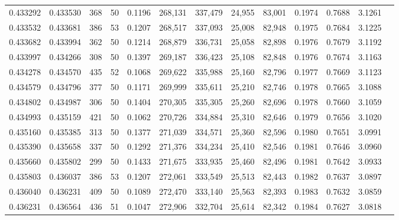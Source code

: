 \begin{tabular}{rrrrrrrrrrrrr}
0.433292 & 0.433530 &   368 &  50 &                                     0.1196 & 268,131 & 337,479 &  24,955 &  83,001 & 0.1974 & 0.7688 & 3.1261 \\
0.433532 & 0.433681 &   386 &  53 &                                     0.1207 & 268,517 & 337,093 &  25,008 &  82,948 & 0.1975 & 0.7684 & 3.1225 \\
0.433682 & 0.433994 &   362 &  50 &                                     0.1214 & 268,879 & 336,731 &  25,058 &  82,898 & 0.1976 & 0.7679 & 3.1192 \\
0.433997 & 0.434266 &   308 &  50 &                                     0.1397 & 269,187 & 336,423 &  25,108 &  82,848 & 0.1976 & 0.7674 & 3.1163 \\
0.434278 & 0.434570 &   435 &  52 &                                     0.1068 & 269,622 & 335,988 &  25,160 &  82,796 & 0.1977 & 0.7669 & 3.1123 \\
0.434579 & 0.434796 &   377 &  50 &                                     0.1171 & 269,999 & 335,611 &  25,210 &  82,746 & 0.1978 & 0.7665 & 3.1088 \\
0.434802 & 0.434987 &   306 &  50 &                                     0.1404 & 270,305 & 335,305 &  25,260 &  82,696 & 0.1978 & 0.7660 & 3.1059 \\
0.434993 & 0.435159 &   421 &  50 &                                     0.1062 & 270,726 & 334,884 &  25,310 &  82,646 & 0.1979 & 0.7656 & 3.1020 \\
0.435160 & 0.435385 &   313 &  50 &                                     0.1377 & 271,039 & 334,571 &  25,360 &  82,596 & 0.1980 & 0.7651 & 3.0991 \\
0.435390 & 0.435658 &   337 &  50 &                                     0.1292 & 271,376 & 334,234 &  25,410 &  82,546 & 0.1981 & 0.7646 & 3.0960 \\
0.435660 & 0.435802 &   299 &  50 &                                     0.1433 & 271,675 & 333,935 &  25,460 &  82,496 & 0.1981 & 0.7642 & 3.0933 \\
0.435803 & 0.436037 &   386 &  53 &                                     0.1207 & 272,061 & 333,549 &  25,513 &  82,443 & 0.1982 & 0.7637 & 3.0897 \\
0.436040 & 0.436231 &   409 &  50 &                                     0.1089 & 272,470 & 333,140 &  25,563 &  82,393 & 0.1983 & 0.7632 & 3.0859 \\
0.436231 & 0.436564 &   436 &  51 &                                     0.1047 & 272,906 & 332,704 &  25,614 &  82,342 & 0.1984 & 0.7627 & 3.0818 \\

\end{tabular}
